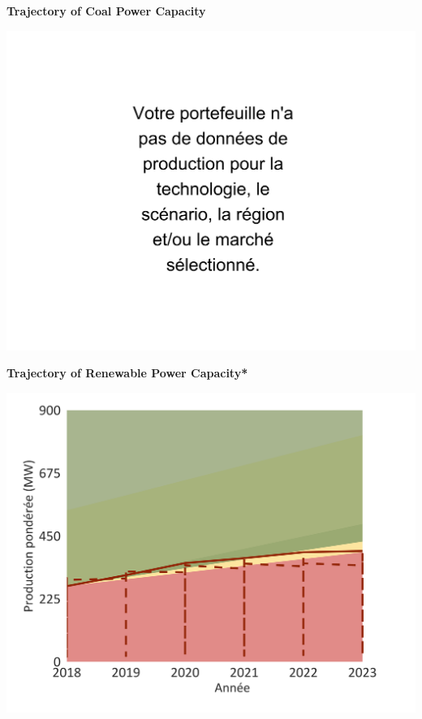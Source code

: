 \documentclass[10pt,table,a4]{article}\usepackage[]{graphicx}\usepackage[]{color}
\begin{document}
	\begin{minipage}[t]{.49\linewidth}
		\textbf{Trajectory of Coal Power Capacity }
		
		\includegraphics[trim = {0 0cm 0 0},width=1\linewidth]{ReportOutputs/Fig17}
		
		\textbf{Trajectory of Renewable Power Capacity* }
		
		\includegraphics[trim = {0 0cm 0 0},width=.99\linewidth]{ReportOutputs/Fig18}
	\end{minipage}	
	\hspace{.02\linewidth}
\end{document}
